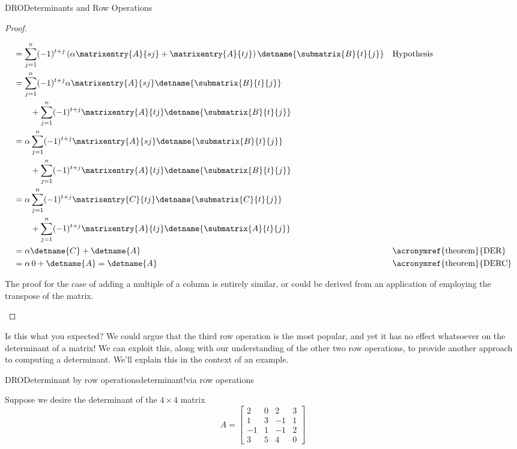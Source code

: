 \begin{subsect}{DRO}{Determinants and Row Operations}
\begin{proof}
\begin{para}
\begin{align*}
%
&=
\sum_{j=1}^{n}(-1)^{t+j}\left(\alpha\matrixentry{A}{sj}+\matrixentry{A}{tj}\right)\detname{\submatrix{B}{t}{j}}
&&\text{Hypothesis}\\
%
&=
\sum_{j=1}^{n}(-1)^{t+j}\alpha\matrixentry{A}{sj}\detname{\submatrix{B}{t}{j}}\\
&\quad\quad+
\sum_{j=1}^{n}(-1)^{t+j}\matrixentry{A}{tj}\detname{\submatrix{B}{t}{j}}\\
%
&=
\alpha\sum_{j=1}^{n}(-1)^{t+j}\matrixentry{A}{sj}\detname{\submatrix{B}{t}{j}}\\
&\quad\quad+
\sum_{j=1}^{n}(-1)^{t+j}\matrixentry{A}{tj}\detname{\submatrix{B}{t}{j}}\\
%
&=
\alpha\sum_{j=1}^{n}(-1)^{t+j}\matrixentry{C}{tj}\detname{\submatrix{C}{t}{j}}\\
&\quad\quad+
\sum_{j=1}^{n}(-1)^{t+j}\matrixentry{A}{tj}\detname{\submatrix{A}{t}{j}}\\
%
&=
\alpha\detname{C}+\detname{A}&&\text{\acronymref{theorem}{DER}}\\
%
&=
\alpha\,0+\detname{A} = \detname{A}&&\text{\acronymref{theorem}{DERC}}
%
\end{align*}
\end{para}
%
\begin{para}The proof for the case of adding a multiple of a column is entirely similar, or could be derived from an application of  employing the transpose of the matrix.\end{para}
%
\end{proof}
%
\begin{para}Is this what you expected?  We could argue that the third row operation is the most popular, and yet it has no effect whatsoever on the determinant of a matrix!  We can exploit this, along with our understanding of the other two row operations, to provide another approach to computing a determinant.  We'll explain this in the context of an example.\end{para}
%
\begin{example}{DRO}{Determinant by row operations}{determinant!via row operations}
\begin{para}Suppose we desire the determinant of the $4\times 4$ matrix
%
\begin{equation*}
A=
\begin{bmatrix}
2 & 0 & 2 & 3 \\
1 & 3 &-1 & 1 \\
-1& 1 &-1 & 2 \\
3 & 5 & 4 & 0
\end{bmatrix}

\end{equation*}
\end{para}
\end{example}
\end{subsect}
